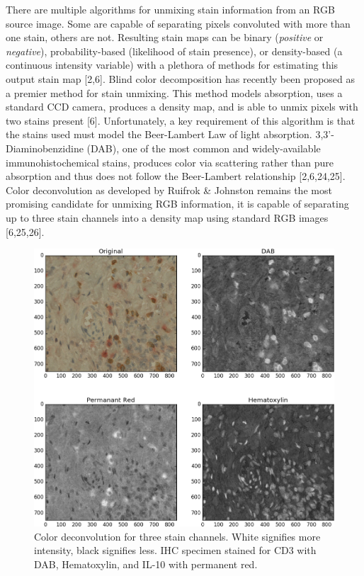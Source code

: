 \documentclass[12pt]{article}
\begin{document}
There are multiple algorithms for unmixing stain information from an RGB source image. Some are capable of separating pixels convoluted with more than one stain, others are not. Resulting stain maps can be binary (\textit{positive} or \textit{negative}), probability-based (likelihood of stain presence), or density-based (a continuous intensity variable) with a plethora of methods for estimating this output stain map [2,6]. Blind color decomposition has recently been proposed as a premier method for stain unmixing. This method models absorption, uses a standard CCD camera, produces a density map, and is able to unmix pixels with two stains present [6]. Unfortunately, a key requirement of this algorithm is that the stains used must model the Beer-Lambert Law of light absorption. 3,3'-Diaminobenzidine (DAB), one of the most common and widely-available immunohistochemical stains, produces color via scattering rather than pure absorption and thus does not follow the Beer-Lambert relationship [2,6,24,25]. Color deconvolution as developed by Ruifrok \& Johnston remains the most promising candidate for unmixing RGB information, it is capable of separating up to three stain channels into a density map using standard RGB images [6,25,26]. 

\begin{figure}[H]
  \includegraphics[width=\linewidth]{1CD.png}
  \caption{Color deconvolution for three stain channels. White signifies more intensity, black signifies less. IHC specimen stained for CD3 with DAB, Hematoxylin, and IL-10 with permanent red.}
  \label{fig:ColorDeconvolution1}
\end{figure}
\end{document}
